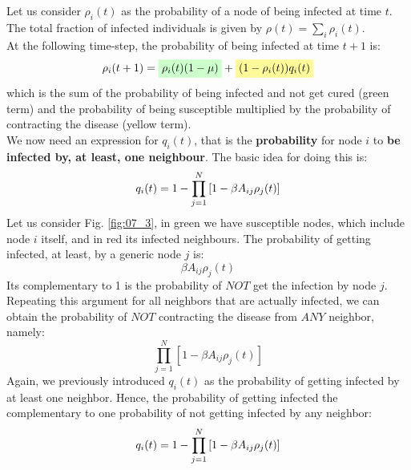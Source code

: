 \documentclass[../main/main.tex]{subfiles}
\begin{document}
Let us consider \( \rho _i (t) \) as the probability of a node of being infected at time \( t \). The total fraction of infected individuals is given by \( \rho (t) = \sum_{i}^{} \rho _i (t)   \).\\
At the following time-step, the probability of being infected at time \( t+1 \) is:
\begin{equation}
  \rho _i (t+1) = \mathcolorbox{green!20}{\rho _i(t) (1- \mu )} + \mathcolorbox{yellow!40}{(1 - \rho _i(t))q_i(t)}
\end{equation}
which is the sum of the probability of being infected and not get cured (green term) and the probability of being susceptible multiplied by the probability of contracting the disease (yellow term).\\
We now need an expression for \( q_i(t) \), that is the \textbf{probability} for node \( i \) to \textbf{be infected by, at least, one neighbour}. The basic idea for doing this is:
\begin{equation}
  q_i (t) = 1 - \prod_{j=1}^{N} \qty[1- \beta A_{ij} \rho _j (t)]
\end{equation}
Let us consider Fig. \ref{fig:07_3}, in green we have susceptible nodes, which include node \( i \) itself, and in red its infected neighbours.
The probability of getting infected, at least, by a generic node $j$ is:
\begin{equation*}
   \beta A_{ij} \rho _j (t) 
\end{equation*}
Its complementary to 1 is the probability of $NOT$ get the infection by node $j$.  
\begin{equation*}
   [1- \beta A_{ij} \rho _j (t)] 
\end{equation*}
Repeating this argument for all neighbors that are actually infected, we can obtain the probability of $NOT$ contracting the disease from $ANY$ neighbor, namely:
\begin{equation*}
    \prod_{j=1}^{N} [1- \beta A_{ij} \rho _j (t)]
\end{equation*}
Again, we previously introduced \(   q_i (t) \) as the probability of getting infected by at least one neighbor. Hence, the probability of getting infected the complementary to one probability of not getting infected by any neighbor:
\begin{equation}
  q_i (t) = 1 - \prod_{j=1}^{N} \qty[1- \beta A_{ij} \rho _j (t)]
\end{equation}
\end{document}
